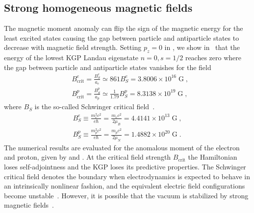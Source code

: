 \subsection{Strong homogeneous magnetic fields}
\label{sec:sbl}
The magnetic moment anomaly can flip the sign of the magnetic energy for the least excited states causing the gap between particle and antiparticle states to decrease with magnetic field strength. Setting $p_z=0$ in , we show in~ that the energy of the lowest KGP Landau eigenstate $n=0, s=1/2$ reaches zero where the gap between particle and antiparticle states vanishes for the field
\begin{subequations}
\begin{alignat}{1}\label{Bcrit}
&B_\mathrm{crit}^{e}=\frac{{B}_{S}^{e}}{a_{e}}\simeq861{B}_{S}^{e} =3.8006\times10^{16}\;\mathrm{G}\;,\\
&B_\mathrm{crit}^{p}=\frac{{B}_{S}^{p}}{a_{p}}\simeq\frac{1}{1.79}{B}_{S}^{p}=8.3138\times10^{19}\;\mathrm{G}\;,
\end{alignat} 
\end{subequations}
where ${B}_{S}$ is the so-called Schwinger critical field~\citep{Schwinger:1951nm}.
\begin{subequations}
\begin{alignat}{1}\label{Bsch}
{B}_{S}^{e}\equiv\frac{{m_{e}^2}c^2}{e\hbar}=\frac{m_{e}c^2}{2\mu_B}=4.4141\times 10^{13}\;\mathrm{G}\;,\\
{B}_{S}^{p}\equiv\frac{{m_{p}^2}c^2}{e\hbar}=\frac{m_{p}c^2}{2\mu_N}=1.4882\times 10^{20}\;\mathrm{G}\;.
\end{alignat}
\end{subequations}
The numerical results are evaluated for the anomalous moment of the electron and proton, given by  and . At the critical field strength $B_\mathrm{crit}$ the Hamiltonian loses self-adjointness and the KGP loses its predictive properties. The Schwinger critical field  denotes the boundary when electrodynamics is expected to behave in an intrinsically nonlinear fashion, and the equivalent electric field configurations become unstable~\citep{Labun:2008re}. However, it is possible that the vacuum is stabilized by strong magnetic fields~\citep{Evans:2018kor}.
 
